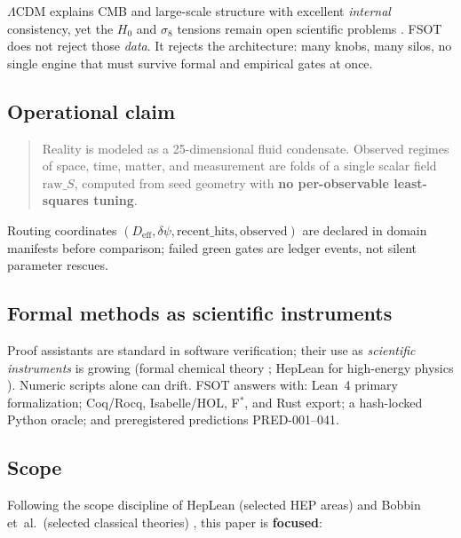 \documentclass[11pt,a4paper]{article}
\begin{document}
$\Lambda$CDM explains CMB and large-scale structure with excellent
\emph{internal} consistency, yet the $H_0$ and $\sigma_8$ tensions remain open
scientific problems \cite{Planck2018,Riess2022,DESY3,PoulinEDE}.
FSOT does not reject those \emph{data}.
It rejects the architecture: many knobs, many silos, no single engine that must
survive formal and empirical gates at once.

\subsection{Operational claim}

\begin{quote}
Reality is modeled as a 25-dimensional fluid condensate.
Observed regimes of space, time, matter, and measurement are folds of a single
scalar field $\mathrm{raw}\_S$, computed from seed geometry with
\textbf{no per-observable least-squares tuning}.
\end{quote}

Routing coordinates $(D_{\mathrm{eff}},\delta\psi,\mathrm{recent\_hits},
\mathrm{observed})$ are declared in domain manifests before comparison; failed
green gates are ledger events, not silent parameter rescues.

\subsection{Formal methods as scientific instruments}

Proof assistants are standard in software verification; their use as
\emph{scientific instruments} is growing (formal chemical theory
\cite{Bobbin2024}; HepLean for high-energy physics \cite{HepLean2024}).
Numeric scripts alone can drift.
FSOT answers with: Lean~4 primary formalization; Coq/Rocq, Isabelle/HOL, F$^*$,
and Rust export; a hash-locked Python oracle; and preregistered predictions
PRED-001--041.

\subsection{Scope}

Following the scope discipline of HepLean (selected HEP areas)
\cite{HepLean2024} and Bobbin et~al.\ (selected classical theories)
\cite{Bobbin2024}, this paper is \textbf{focused}:
\end{document}

